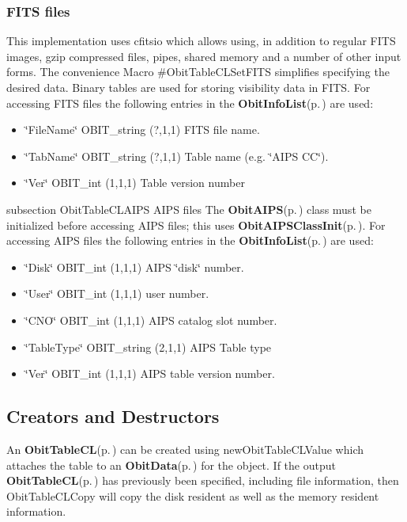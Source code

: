 \subsubsection{FITS files}\label{ObitTableWX_8h_TableFITS}
This implementation uses cfitsio which allows using, in addition to regular FITS images, gzip compressed files, pipes, shared memory and a number of other input forms. The convenience Macro \#Obit\-Table\-CLSet\-FITS simplifies specifying the desired data. Binary tables are used for storing visibility data in FITS. For accessing FITS files the following entries in the {\bf Obit\-Info\-List}{\rm (p.\,\pageref{structObitInfoList})} are used: \begin{itemize}
\item \char`\"{}File\-Name\char`\"{} OBIT\_\-string (?,1,1) FITS file name. \item \char`\"{}Tab\-Name\char`\"{} OBIT\_\-string (?,1,1) Table name (e.g. \char`\"{}AIPS CC\char`\"{}). \item \char`\"{}Ver\char`\"{} OBIT\_\-int (1,1,1) Table version number\end{itemize}
subsection Obit\-Table\-CLAIPS AIPS files The {\bf Obit\-AIPS}{\rm (p.\,\pageref{structObitAIPS})} class must be initialized before accessing AIPS files; this uses {\bf Obit\-AIPSClass\-Init}{\rm (p.\,\pageref{ObitAIPS_8c_a5})}. For accessing AIPS files the following entries in the {\bf Obit\-Info\-List}{\rm (p.\,\pageref{structObitInfoList})} are used: \begin{itemize}
\item \char`\"{}Disk\char`\"{} OBIT\_\-int (1,1,1) AIPS \char`\"{}disk\char`\"{} number. \item \char`\"{}User\char`\"{} OBIT\_\-int (1,1,1) user number. \item \char`\"{}CNO\char`\"{} OBIT\_\-int (1,1,1) AIPS catalog slot number. \item \char`\"{}Table\-Type\char`\"{} OBIT\_\-string (2,1,1) AIPS Table type \item \char`\"{}Ver\char`\"{} OBIT\_\-int (1,1,1) AIPS table version number.\end{itemize}
\subsection{Creators and Destructors}\label{ObitTableCL_8h_ObitTableCLaccess}
An {\bf Obit\-Table\-CL}{\rm (p.\,\pageref{structObitTableCL})} can be created using new\-Obit\-Table\-CLValue which attaches the table to an {\bf Obit\-Data}{\rm (p.\,\pageref{structObitData})} for the object. If the output {\bf Obit\-Table\-CL}{\rm (p.\,\pageref{structObitTableCL})} has previously been specified, including file information, then Obit\-Table\-CLCopy will copy the disk resident as well as the memory resident information.

